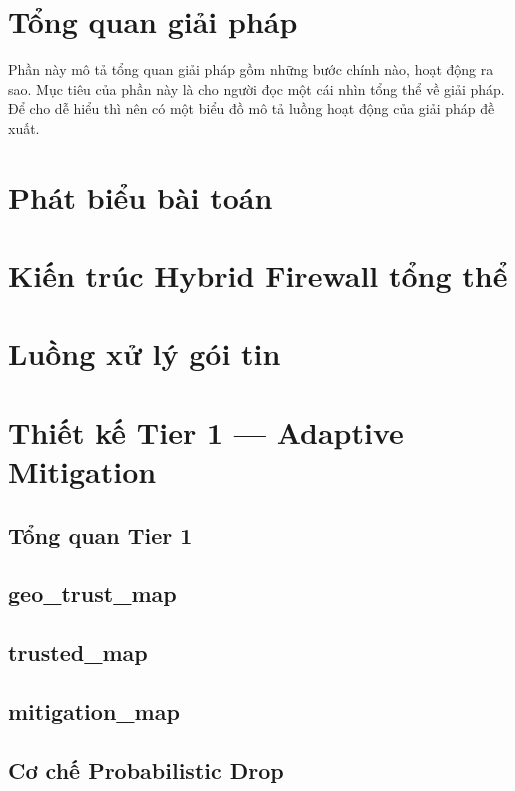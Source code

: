 \documentclass[../DoAn.tex]{subfiles}
\begin{document}
\section{Tổng quan giải pháp}

Phần này mô tả tổng quan giải pháp gồm những bước chính nào, hoạt động ra sao. Mục tiêu của phần này là cho người đọc một cái nhìn tổng thể về giải pháp. Để cho dễ hiểu thì nên có một biểu đồ mô tả luồng hoạt động của giải pháp đề xuất. 

\section{Phát biểu bài toán}

\section{Kiến trúc Hybrid Firewall tổng thể}

\section{Luồng xử lý gói tin}

\section{Thiết kế Tier 1 — Adaptive Mitigation}

\subsection{Tổng quan Tier 1}

\subsection{geo\_trust\_map}

\subsection{trusted\_map}

\subsection{mitigation\_map}

\subsection{Cơ chế Probabilistic Drop}
\end{document}
